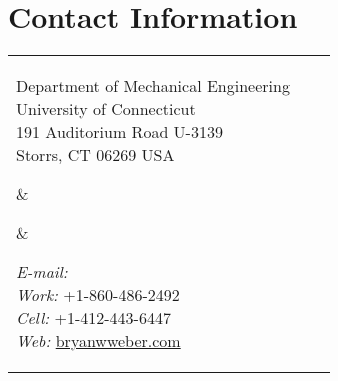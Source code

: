 




\section{Contact Information}

%
%
\newlength{\rcollength}\setlength{\rcollength}{2.05in}%
\newlength{\spacewidth}\setlength{\spacewidth}{30pt}
%
\begin{tabular}[t]{@{}p{\textwidth-\rcollength-\spacewidth}@{}p{\spacewidth}@{}p{\rcollength}}%

\parbox{\textwidth-\rcollength-\spacewidth}{%
Department of Mechanical Engineering\\
University of Connecticut\\
191 Auditorium Road U-3139\\
Storrs, CT 06269 USA}

&
{\vrule width 0.5pt}
\parbox[m][4\baselineskip]{\spacewidth}{} &

\parbox{\rcollength}{%
\textit{E-mail:} \\
\textit{Work:} +1-860-486-2492 \\
\textit{Cell:} +1-412-443-6447 \\
\textit{Web:} \href{http://bryanwweber.com}{bryanwweber.com}
}%

\end{tabular}

